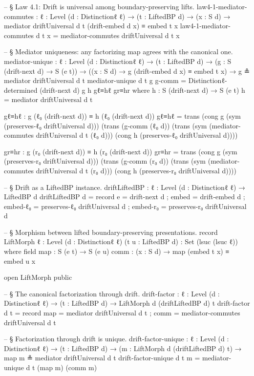 \documentclass[11pt,a4paper]{book}
\begin{document}
\begin{code}
-- § Law 4.1: Drift is universal among boundary-preserving lifts.
law4-1-mediator-commutes :
  {ℓ : Level} (d : Distinctionℓ ℓ) → (t : LiftedBP d) →
  (x : S d) → mediator driftUniversal d t (drift-embed d x) ≡ embed t x
law4-1-mediator-commutes d t x = mediator-commutes driftUniversal d t x

-- § Mediator uniqueness: any factorizing map agrees with the canonical one.
mediator-unique :
  {ℓ : Level} (d : Distinctionℓ ℓ) → (t : LiftedBP d) →
  (g : S (drift-next d) → S (e t)) →
  ((x : S d) → g (drift-embed d x) ≡ embed t x) →
  g ≗ mediator driftUniversal d t
mediator-unique d t g g-comm =
  Distinctionℓ-determined (drift-next d) g h gℓ≡hℓ gr≡hr
  where
    h : S (drift-next d) → S (e t)
    h = mediator driftUniversal d t

    gℓ≡hℓ : g (ℓ₀ (drift-next d)) ≡ h (ℓ₀ (drift-next d))
    gℓ≡hℓ =
      trans (cong g (sym (preserves-ℓ₀ driftUniversal d)))
        (trans (g-comm (ℓ₀ d))
          (trans (sym (mediator-commutes driftUniversal d t (ℓ₀ d)))
            (cong h (preserves-ℓ₀ driftUniversal d))))

    gr≡hr : g (r₀ (drift-next d)) ≡ h (r₀ (drift-next d))
    gr≡hr =
      trans (cong g (sym (preserves-r₀ driftUniversal d)))
        (trans (g-comm (r₀ d))
          (trans (sym (mediator-commutes driftUniversal d t (r₀ d)))
            (cong h (preserves-r₀ driftUniversal d))))

-- § Drift as a LiftedBP instance.
driftLiftedBP : {ℓ : Level} (d : Distinctionℓ ℓ) → LiftedBP d
driftLiftedBP d = record
  { e        = drift-next d
  ; embed    = drift-embed d
  ; embed-ℓ₀ = preserves-ℓ₀ driftUniversal d
  ; embed-r₀ = preserves-r₀ driftUniversal d
  }

-- § Morphism between lifted boundary-preserving presentations.
record LiftMorph {ℓ : Level} (d : Distinctionℓ ℓ) (t u : LiftedBP d) : Set (lsuc (lsuc ℓ)) where
  field
    map  : S (e t) → S (e u)
    comm : (x : S d) → map (embed t x) ≡ embed u x

open LiftMorph public

-- § The canonical factorization through drift.
drift-factor :
  {ℓ : Level} (d : Distinctionℓ ℓ) → (t : LiftedBP d) →
  LiftMorph d (driftLiftedBP d) t
drift-factor d t = record
  { map  = mediator driftUniversal d t
  ; comm = mediator-commutes driftUniversal d t
  }

-- § Factorization through drift is unique.
drift-factor-unique :
  {ℓ : Level} (d : Distinctionℓ ℓ) → (t : LiftedBP d) →
  (m : LiftMorph d (driftLiftedBP d) t) →
  map m ≗ mediator driftUniversal d t
drift-factor-unique d t m =
  mediator-unique d t (map m) (comm m)
\end{code}
\end{document}
